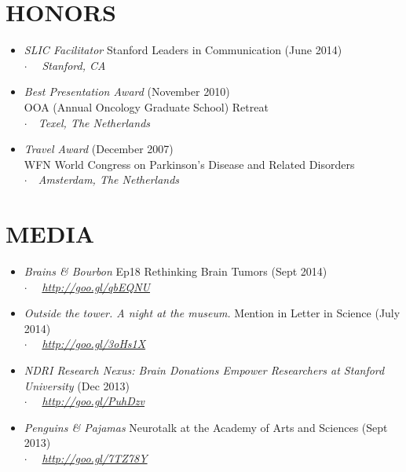 \documentclass[line,margin]{res}
\newcommand{\placestyle}[1]{\footnotesize $\cdot$\ \ {\emph{#1}}}
\newcommand{\datestyle}[1]{{\tiny \dotfill} {\small (#1)}}
\begin{document}
\begin{resume}
\section{HONORS}
\begin{itemize}
\item \emph{SLIC Facilitator} Stanford Leaders in Communication \datestyle{June 2014} \\
  { \placestyle{ Stanford, CA } }
\item \emph{Best Presentation Award} \datestyle{November 2010} \\
    {OOA (Annual Oncology Graduate School) Retreat} \\
    { \placestyle{Texel, The Netherlands} }
\item \emph{Travel Award} \datestyle{December 2007} \\
    {WFN World Congress on Parkinson's Disease and Related Disorders}  \\
    { \placestyle{Amsterdam, The Netherlands} }
\end{itemize}

\section{MEDIA}
\begin{itemize}
\item \emph{Brains \& Bourbon} Ep18 Rethinking Brain Tumors \datestyle{Sept 2014} \\
  {\placestyle{ \url{http://goo.gl/qbEQNU}}}
\item \emph{Outside the tower. A night at the museum.} Mention in Letter in Science \datestyle{July 2014} \\
  {\placestyle{ \url{http://goo.gl/3oHs1X}}}
\item \emph{NDRI Research Nexus: Brain Donations Empower Researchers at Stanford University} \datestyle{Dec 2013}\\
  {\placestyle{ \url{http://goo.gl/PuhDzv}}}
\item \emph{Penguins \& Pajamas} Neurotalk at the Academy of Arts and Sciences \datestyle{Sept 2013} \\
  {\placestyle{ \url{http://goo.gl/7TZ78Y}}}
\end{itemize}


\end{resume}
\end{document}
